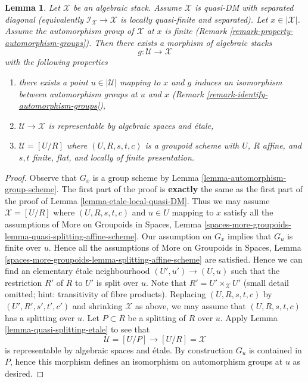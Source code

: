 \documentclass{stacks-project}
\theoremstyle{plain}
\newtheorem{lemma}[subsection]{Lemma}
\theoremstyle{definition}
\theoremstyle{remark}
\numberwithin{equation}{subsection}
\begin{document}
\begin{lemma}
\label{lemma-etale-local-quasi-DM-at-x}
Let $\mathcal{X}$ be an algebraic stack. Assume $\mathcal{X}$ is
quasi-DM with separated diagonal (equivalently
$\mathcal{I}_\mathcal{X} \to \mathcal{X}$ is locally quasi-finite and
separated). Let $x \in |\mathcal{X}|$. Assume the
automorphism group of $\mathcal{X}$ at $x$ is finite
(Remark \ref{remark-property-automorphism-groups}).
Then there exists a morphism of algebraic stacks
$$
g : \mathcal{U} \longrightarrow \mathcal{X}
$$
with the following properties
\begin{enumerate}
\item there exists a point $u \in |\mathcal{U}|$ mapping to $x$ and
$g$ induces an isomorphism between automorphism groups at $u$ and $x$
(Remark \ref{remark-identify-automorphism-groups}),
\item $\mathcal{U} \to \mathcal{X}$ is representable by algebraic spaces and
\'etale,
\item $\mathcal{U} = [U/R]$ where $(U, R, s, t, c)$ is a groupoid
scheme with $U$, $R$ affine, and $s, t$ finite, flat, and
locally of finite presentation.
\end{enumerate}
\end{lemma}

\begin{proof}
Observe that $G_x$ is a group scheme by
Lemma \ref{lemma-automorphism-group-scheme}.
The first part of the proof is {\bf exactly} the same as the first part
of the proof of Lemma \ref{lemma-etale-local-quasi-DM}.
Thus we may assume $\mathcal{X} = [U/R]$ where $(U, R, s, t, c)$
and $u \in U$ mapping to $x$ satisfy all the assumptions of
More on Groupoids in Spaces, Lemma
\ref{spaces-more-groupoids-lemma-quasi-splitting-affine-scheme}.
Our assumption on $G_x$ implies that $G_u$ is finite over $u$.
Hence all the assumptions of
More on Groupoids in Spaces, Lemma
\ref{spaces-more-groupoids-lemma-splitting-affine-scheme}
are satisfied.
Hence we can find an elementary \'etale neighbourhood
$(U', u') \to (U, u)$ such that the restriction $R'$ of $R$ to $U'$
is split over $u$. Note that $R' = U' \times_\mathcal{X} U'$
(small detail omitted; hint: transitivity of fibre products).
Replacing $(U, R, s, t, c)$ by $(U', R', s', t', c')$ and shrinking
$\mathcal{X}$ as above, we may assume that $(U, R, s, t, c)$ has
a splitting over $u$. Let $P \subset R$ be a splitting of $R$ over $u$.
Apply Lemma \ref{lemma-quasi-splitting-etale} to see that
$$
\mathcal{U} = [U/P] \longrightarrow [U/R] = \mathcal{X}
$$
is representable by algebraic spaces and \'etale. By construction
$G_u$ is contained in $P$, hence this morphism defines an isomorphism
on automorphism groups at $u$ as desired.
\end{proof}
\end{document}
